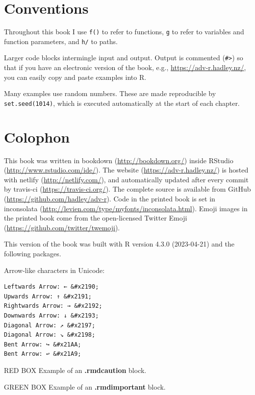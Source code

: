 \documentclass[
]{book}
\renewcommand{\href}[2]{#2 (\url{#1})}
\begin{document}
\hypertarget{conventions}{%
\section{Conventions}\label{conventions}}

Throughout this book I use \texttt{f()} to refer to functions, \texttt{g} to refer to variables and function parameters, and \texttt{h/} to paths.

Larger code blocks intermingle input and output. Output is commented (\texttt{\#\textgreater{}}) so that if you have an electronic version of the book, e.g., \url{https://adv-r.hadley.nz/}, you can easily copy and paste examples into R.

Many examples use random numbers. These are made reproducible by \texttt{set.seed(1014)}, which is executed automatically at the start of each chapter.

\newpage

\hypertarget{colophon}{%
\section{Colophon}\label{colophon}}

This book was written in \href{http://bookdown.org/}{bookdown} inside \href{http://www.rstudio.com/ide/}{RStudio}. The \href{https://adv-r.hadley.nz/}{website} is hosted with \href{http://netlify.com/}{netlify}, and automatically updated after every commit by \href{https://travis-ci.org/}{travis-ci}. The complete source is available from \href{https://github.com/hadley/adv-r}{GitHub}. Code in the printed book is set in \href{http://levien.com/type/myfonts/inconsolata.html}{inconsolata}. Emoji images in the printed book come from the open-licensed \href{https://github.com/twitter/twemoji}{Twitter Emoji}.

This version of the book was built with R version 4.3.0 (2023-04-21) and the following packages.

Arrow-like characters in Unicode:

\begin{verbatim}
Leftwards Arrow: ← &#x2190;
Upwards Arrow: ↑ &#x2191;
Rightwards Arrow: → &#x2192;
Downwards Arrow: ↓ &#x2193;
Diagonal Arrow: ↗ &#x2197;
Diagonal Arrow: ↘ &#x2198;
Bent Arrow: ↪ &#x21AA;
Bent Arrow: ↩ &#x21A9;
\end{verbatim}

RED BOX Example of an \textbf{.rmdcaution} block.

GREEN BOX Example of an \textbf{.rmdimportant} block.
\end{document}
